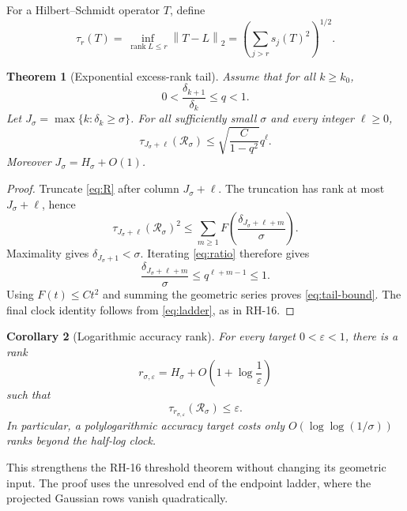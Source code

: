 \documentclass[11pt]{article}
\newtheorem{theorem}{Theorem}[section]
\newtheorem{corollary}[theorem]{Corollary}
\theoremstyle{remark}
\newcommand{\norm}[1]{\left\lVert#1\right\rVert}
\newcommand{\cR}{\mathcal R}
\begin{document}
For a Hilbert--Schmidt operator $T$, define
\begin{equation}
 \tau_r(T)=\inf_{\operatorname{rank}L\le r}\norm{T-L}_2
 =\left(\sum_{j>r}s_j(T)^2\right)^{1/2}.
 \label{eq:tau}
\end{equation}

\begin{theorem}[Exponential excess-rank tail]
\label{thm:tail}
Assume that for all $k\ge k_0$,
\begin{equation}
 0<\frac{\delta_{k+1}}{\delta_k}\le q<1.
 \label{eq:ratio}
\end{equation}
Let $J_\sigma=\max\{k:\delta_k\ge\sigma\}$.  For all sufficiently small
$\sigma$ and every integer $\ell\ge0$,
\begin{equation}
 \boxed{
 \tau_{J_\sigma+\ell}(\cR_\sigma)
 \le \sqrt{\frac{C}{1-q^2}}q^\ell.}
 \label{eq:tail-bound}
\end{equation}
Moreover $J_\sigma=H_\sigma+O(1)$.
\end{theorem}

\begin{proof}
Truncate \eqref{eq:R} after column $J_\sigma+\ell$.  The truncation has rank
at most $J_\sigma+\ell$, hence
\[
 \tau_{J_\sigma+\ell}(\cR_\sigma)^2
 \le \sum_{m\ge1}
 F\!\left(\frac{\delta_{J_\sigma+\ell+m}}\sigma\right).
\]
Maximality gives $\delta_{J_\sigma+1}<\sigma$.  Iterating
\eqref{eq:ratio} therefore gives
\[
 \frac{\delta_{J_\sigma+\ell+m}}\sigma
 \le q^{\ell+m-1}\le1.
\]
Using $F(t)\le Ct^2$ and summing the geometric series proves
\eqref{eq:tail-bound}.  The final clock identity follows from
\eqref{eq:ladder}, as in RH-16.
\end{proof}

\begin{corollary}[Logarithmic accuracy rank]
\label{cor:accuracy}
For every target $0<\varepsilon<1$, there is a rank
\begin{equation}
 r_{\sigma,\varepsilon}
 =H_\sigma+O\!\left(1+\log\frac1\varepsilon\right)
 \label{eq:accuracy-rank}
\end{equation}
such that
\[
 \tau_{r_{\sigma,\varepsilon}}(\cR_\sigma)\le\varepsilon.
\]
In particular, a polylogarithmic accuracy target costs only
$O(\log\log(1/\sigma))$ ranks beyond the half-log clock.
\end{corollary}

This strengthens the RH-16 threshold theorem without changing its geometric
input.  The proof uses the unresolved end of the endpoint ladder, where the
projected Gaussian rows vanish quadratically.
\end{document}
